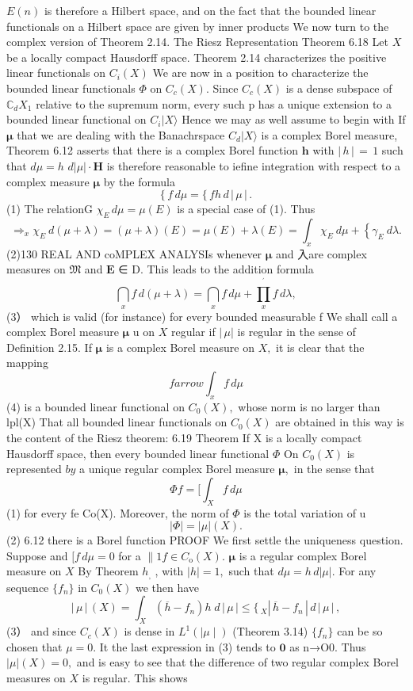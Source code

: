 $\scriptstyle{E(n)}$ is therefore a Hilbert space, and on the fact that the bounded linear functionals on a Hilbert space are given by inner products We now turn to the complex version of Theorem 2.14. The Riesz Representation Theorem 6.18 Let $\textstyle X{\mathrm{~}}$ be a locally compact Hausdorff space. Theorem 2.14 characterizes the positive linear functionals on $\scriptstyle C_{i}(X)$ We are now in a position to characterize the bounded linear functionals $\Phi$ on $C_{c}(X).$ Since $C_{c}(X)$ is a dense subspace of $\mathbb{C}_{d}X_{1}$ relative to the supremum norm, every such p has a unique extension to a bounded linear functional on $\scriptstyle C_{i}|X\rangle$ Hence we may as well assume to begin with If $\boldsymbol{\mu}$ that we are dealing with the Banachrspace $\scriptstyle C_{d}|X\rangle$ is a complex Borel measure, Theorem 6.12 asserts that there is a complex Borel function $\boldsymbol{h}$ with $|\,h\,|\,=\,1$ such that $d\mu=h$ $d|\mu|\cdot\mathbf{H}$ is therefore reasonable to iefine integration with respect to a complex measure ${\boldsymbol{\mu}}$ by the formula $$ \{\,f\,d\mu= \{\,f h\,d\,|\,\mu\,|\,. $$ (1) The relationG $\chi_{E}\,d\mu=\mu(E)$ is a special case of (1). Thus $$ \Rightarrow_{x}^{}\chi_{E}~d(\mu+\lambda)=(\mu+\lambda)(E)=\mu(E)+\lambda(E)=\int_{x}\chi_{E}~d\mu+\left\{\gamma_{E}~d\lambda\right. . $$ (2)130 REAL AND coMPLEX ANALYSIs whenever ${\boldsymbol{\mu}}$ and 入are complex measures on ${\mathfrak{M}}$ and $\boldsymbol{E}$ ∈ D. This leads to the addition formula $$ \bigcap_{x}f\,d(\mu+\lambda)=\bigcap_{x}f\,d\mu+\prod_{x}^{^{\prime}}f\,d\lambda, $$ (3） which is valid (for instance) for every bounded measurable f We shall call a complex Borel measure $\boldsymbol{\mu}$ u on $X$ regular if $\left|\,\mu\right|$ is regular in the sense of Definition 2.15. If ${\boldsymbol{\mu}}$ is a complex Borel measure on $X,$ it is clear that the mapping $$ f arrow\int_{x}f\,d\mu $$ (4) is a bounded linear functional on $C_{0}(X),$ whose norm is no larger than lpl(X) That all bounded linear functionals on $C_{0}(X)$ are obtained in this way is the content of the Riesz theorem: 6.19 Theorem If X is a locally compact Hausdorff space, then every bounded linear functional $\Phi$ On $C_{0}(X)$ is represented $b y$ a unique regular complex Borel measure ${\boldsymbol{\mu}},$ in the sense that $$ \Phi f= [\int_{X}f\,d\mu $$ (1) for every fe Co(X). Moreover, the norm of $\Phi$ is the total variation of u $$ |\Phi|=|\mu|(X). $$ (2) 6.12 there is a Borel function PROOF We first settle the uniqueness question. Suppose and $[f\,d\mu=0$ for a $\|1f\in C_{\mathrm{o}}(X).$ ${\boldsymbol{\mu}}$ is a regular complex Borel measure on $\textstyle X$ By Theorem $h_{\mathrm{,}}$ , with $|h|=1,$ such that $d\mu=h\,d|\mu|.$ For any sequence $\{f_{n}\}$ in $C_{0}(X)$ we then have $$ |\,\mu\,|\,(X)=\int_{X}(\overline{{{h}}}-f_{n})h\;d\,|\,\mu\,|\leq \{\,\!\!_{X}|\,\overline{{{h}}}-f_{n}\,|\,d\,|\,\mu\,|\,, $$ (3） and since $C_{c}(X)$ is dense in $L^{1}(\mid\mu\mid)$ (Theorem 3.14) $\{f_{n}\}$ can be so chosen that $\mu=0.$ It the last expression in (3) tends to $\mathbf{0}$ as n→O0. Thus $|\mu|(X)=0,$ and is easy to see that the difference of two regular complex Borel measures on $X$ is regular. This shows 
